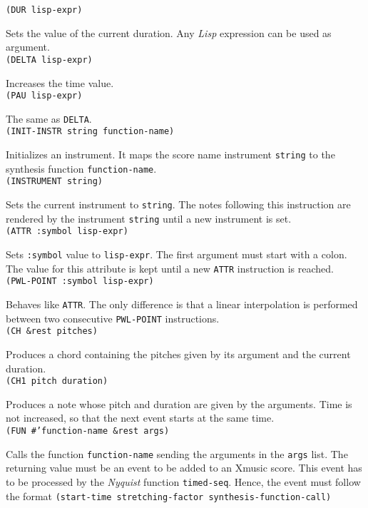 \noindent\texttt{(DUR lisp-expr)}\par
Sets the value of the current duration. Any \textit{Lisp} expression can be used as argument.\\ 

\noindent\texttt{(DELTA lisp-expr)}\par
 Increases the time value.\\

\noindent\texttt{(PAU lisp-expr)}\par
 The same as \texttt{DELTA}.\\

\noindent\texttt{(INIT-INSTR string function-name)}\par
Initializes an instrument. It maps the score name instrument \texttt{string} to the synthesis function \texttt{function-name}.\\

\noindent\texttt{(INSTRUMENT string)}\par
 Sets the current instrument to \texttt{string}. The notes following this instruction are rendered by the instrument \texttt{string} until a new instrument is set.\\

\noindent\texttt{(ATTR :symbol lisp-expr)} \par
Sets \texttt{:symbol} value to \texttt{lisp-expr}. The first argument must start with a colon. The value for this attribute is kept until a new \texttt{ATTR} instruction is reached.\\ 

\noindent\texttt{(PWL-POINT :symbol lisp-expr)}\par
 Behaves like \texttt{ATTR}. The only difference is that a linear interpolation is performed between two consecutive \texttt{PWL-POINT} instructions.\\

\noindent\texttt{(CH \&rest pitches)} \par
Produces a chord containing the pitches given by its argument and the current duration.\\

\noindent\texttt{(CH1 pitch duration)} \par
Produces a note whose pitch and duration are given by the arguments. Time is not increased, so that the next event starts at the same time.\\ 

\noindent\texttt{(FUN \#'function-name \&rest args)} \par
Calls the function \texttt{function-name} sending the arguments in the \texttt{args} list. The returning value must be an event to be added to an Xmusic score. This event has to be processed by the \textit{Nyquist} function \texttt{timed-seq}. Hence, the event must follow the format \texttt{(start-time stretching-factor synthesis-function-call)}\\
 
